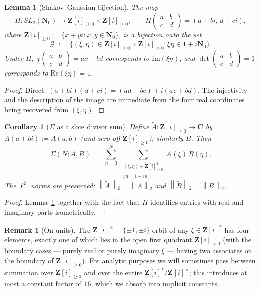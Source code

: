 \documentclass[11pt]{article}
\newtheorem{lemma}[theorem]{Lemma}
\newtheorem{corollary}[theorem]{Corollary}
\theoremstyle{definition}
\newtheorem{remark}[theorem]{Remark}
\newcommand{\Nz}{\mathbf{N}_0}
\newcommand{\Z}{\mathbf{Z}}
\newcommand{\C}{\mathbf{C}}
\newcommand{\Zi}{\Z[i]}
\newcommand{\SLNz}{SL_2(\Nz)}
\renewcommand{\Re}{\mathrm{Re}}
\renewcommand{\Im}{\mathrm{Im}}
\newcommand{\norm}[1]{\left\lVert #1\right\rVert}
\begin{document}
\begin{lemma}[Shakov--Gaussian bijection]\label{lem:shakov-gaussian}
The map
\[
\Pi:\SLNz\to\Zi_{\ge 0}\times\Zi_{\ge 0},\qquad \Pi\begin{pmatrix}a&b\\c&d\end{pmatrix}=(a+bi,\,d+ci),
\]
where $\Zi_{\ge 0}:=\{x+yi:x,y\in\Nz\}$, is a bijection onto the set
\[
\mathcal{G}\;:=\;\{(\xi,\eta)\in\Zi_{\ge 0}\times\Zi_{\ge 0}:\xi\eta\in 1+i\Nz\}.
\]
Under $\Pi$, $\chi\!\begin{pmatrix}a&b\\c&d\end{pmatrix}=ac+bd$ corresponds to $\Im(\xi\eta)$, and $\det\!\begin{pmatrix}a&b\\c&d\end{pmatrix}=1$ corresponds to $\Re(\xi\eta)=1$.
\end{lemma}

\begin{proof}
Direct: $(a+bi)(d+ci)=(ad-bc)+i(ac+bd)$. The injectivity and the description of the image are immediate from the four real coordinates being recovered from $(\xi,\eta)$.
\end{proof}

\begin{corollary}[$\Sigma$ as a slice divisor sum]\label{cor:Sigma-as-slice-sum}
Define $\widetilde A:\Zi_{\ge 0}\to\C$ by $\widetilde A(a+bi):=A(a,b)$ (and zero off $\Zi_{\ge 0}$); similarly $\widetilde B$. Then
\[
\Sigma(N;A,B)\;=\;\sum_{n=0}^N\;\sum_{\substack{(\xi,\eta)\in\Zi_{\ge 0}^2\\ \xi\eta=1+in}}\widetilde A(\xi)\,\widetilde B(\eta).
\]
The $\ell^2$ norms are preserved: $\norm{\widetilde A}_2=\norm{A}_2$ and $\norm{\widetilde B}_2=\norm{B}_2$.
\end{corollary}

\begin{proof}
Lemma~\ref{lem:shakov-gaussian} together with the fact that $\Pi$ identifies entries with real and imaginary parts isometrically.
\end{proof}

\begin{remark}[On units]\label{rmk:units}
The $\Zi^\times=\{\pm1,\pm i\}$ orbit of any $\xi\in\Zi^*$ has four elements, exactly one of which lies in the open first quadrant $\Zi_{>0}$ (with the boundary cases --- purely real or purely imaginary $\xi$ --- having two associates on the boundary of $\Zi_{\ge 0}$). For analytic purposes we will sometimes pass between summation over $\Zi_{\ge 0}$ and over the entire $\Zi^*/\Zi^\times$; this introduces at most a constant factor of $16$, which we absorb into implicit constants.
\end{remark}
\end{document}
